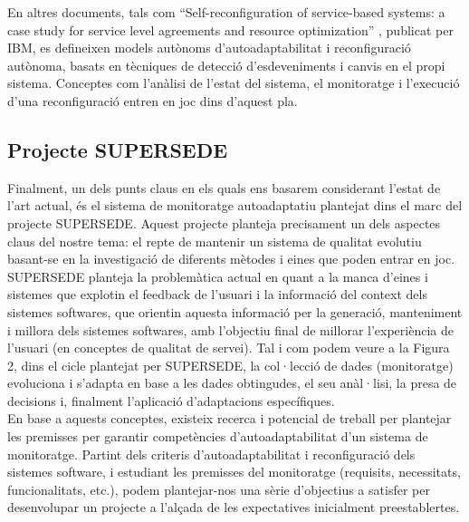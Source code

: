 En altres documents, tals com “Self-reconfiguration of service-based systems: a case study for service level agreements and resource optimization” , publicat per IBM, es defineixen models autònoms d’autoadaptabilitat i reconfiguració autònoma, basats en tècniques de detecció d’esdeveniments i canvis en el propi sistema. Conceptes com l’anàlisi de l’estat del sistema, el monitoratge i l’execució d’una reconfiguració entren en joc dins d’aquest pla.


\subsection{Projecte SUPERSEDE}

Finalment, un dels punts claus en els quals ens basarem considerant l’estat de l’art actual, és el sistema de monitoratge autoadaptatiu plantejat dins el marc del projecte SUPERSEDE. Aquest projecte planteja precisament un dels aspectes claus del nostre tema: el repte de mantenir un sistema de qualitat evolutiu basant-se en la investigació de diferents mètodes i eines que poden entrar en joc. \\

SUPERSEDE planteja la problemàtica actual en quant a la manca d’eines i sistemes que explotin el feedback de l’usuari i la informació del context dels sistemes softwares, que orientin aquesta informació per la generació, manteniment i millora dels sistemes softwares, amb l’objectiu final de millorar l’experiència de l’usuari (en conceptes de qualitat de servei). Tal i com podem veure a la Figura 2, dins el cicle plantejat per SUPERSEDE, la col·lecció de dades (monitoratge) evoluciona i s’adapta en base a les dades obtingudes, el seu anàl·lisi, la presa de decisions i, finalment l’aplicació d’adaptacions específiques. \\

En base a aquests conceptes, existeix recerca i potencial de treball per plantejar les premisses per garantir competències d’autoadaptabilitat d’un sistema de monitoratge. Partint dels criteris d’autoadaptabilitat i reconfiguració dels sistemes software, i estudiant les premisses del monitoratge (requisits, necessitats, funcionalitats, etc.), podem plantejar-nos una sèrie d’objectius a satisfer per desenvolupar un projecte a l’alçada de les expectatives inicialment preestablertes.\\
